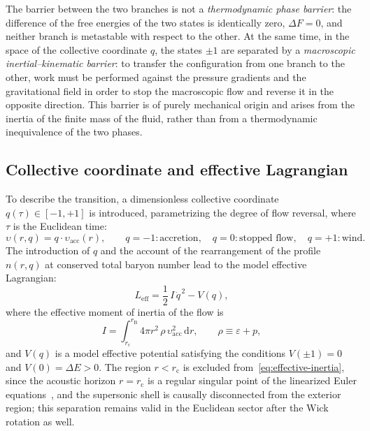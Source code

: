 \documentclass[12pt,a4paper,preprint]{elsarticle}
\begin{document}
            The barrier between the two branches is not a \emph{thermodynamic phase barrier}: the difference of the free energies of the two states is identically zero, $\Delta F = 0$, and neither branch is metastable with respect to the other. At the same time, in the space of the collective coordinate $q$, the states $\pm 1$ are separated by a \emph{macroscopic inertial--kinematic barrier}: to transfer the configuration from one branch to the other, work must be performed against the pressure gradients and the gravitational field in order to stop the macroscopic flow and reverse it in the opposite direction. This barrier is of purely mechanical origin and arises from the inertia of the finite mass of the fluid, rather than from a thermodynamic inequivalence of the two phases.

        \subsection{Collective coordinate and effective Lagrangian}\label{subsec:collective-coordinate}
            To describe the transition, a dimensionless collective coordinate $q(\tau) \in [-1, +1]$ is introduced, parametrizing the degree of flow reversal, where $\tau$ is the Euclidean time:
            \begin{equation}
                \upsilon(r, q) = q \cdot \upsilon_{\mathrm{acc}}(r), \qquad q = -1: \text{accretion}, \quad q = 0: \text{stopped flow}, \quad q = +1: \text{wind}.
                \label{eq:collective-coordinate}
            \end{equation}
            The introduction of $q$ and the account of the rearrangement of the profile $n(r, q)$ at conserved total baryon number lead to the model effective Lagrangian:
            \begin{equation}
                L_{\mathrm{eff}} = \frac{1}{2}\,I\,\dot{q}^{\,2} - V(q),
                \label{eq:effective-lagrangian}
            \end{equation}
            where the effective moment of inertia of the flow is
            \begin{equation}
                I = \int_{r_{\mathrm{c}}}^{r_{\mathrm{B}}} 4\pi r^{2}\,\rho\,\upsilon_{\mathrm{acc}}^{2}\,\mathrm{d}r, \qquad \rho \equiv \varepsilon + p,
                \label{eq:effective-inertia}
            \end{equation}
            and $V(q)$ is a model effective potential satisfying the conditions $V(\pm 1) = 0$ and $V(0) = \Delta E > 0$. The region $r < r_{\mathrm{c}}$ is excluded from~\eqref{eq:effective-inertia}, since the acoustic horizon $r = r_{\mathrm{c}}$ is a regular singular point of the linearized Euler equations~\cite{SemyannikovAV_PerturbationSpectrumOfMichelFlowAcousticVorticalAndEntropyModes_2026}, and the supersonic shell is causally disconnected from the exterior region; this separation remains valid in the Euclidean sector after the Wick rotation as well.
            
\end{document}
